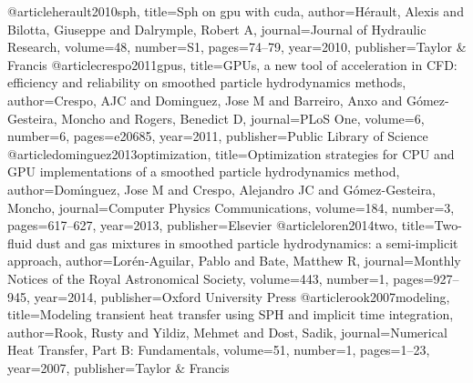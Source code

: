 @article{herault2010sph,
  title={Sph on gpu with cuda},
  author={H{\'e}rault, Alexis and Bilotta, Giuseppe and Dalrymple, Robert A},
  journal={Journal of Hydraulic Research},
  volume={48},
  number={S1},
  pages={74--79},
  year={2010},
  publisher={Taylor \& Francis}
}
@article{crespo2011gpus,
  title={GPUs, a new tool of acceleration in CFD: efficiency and reliability on smoothed particle hydrodynamics methods},
  author={Crespo, AJC and Dominguez, Jose M and Barreiro, Anxo and G{\'o}mez-Gesteira, Moncho and Rogers, Benedict D},
  journal={PLoS One},
  volume={6},
  number={6},
  pages={e20685},
  year={2011},
  publisher={Public Library of Science}
}
@article{dominguez2013optimization,
  title={Optimization strategies for CPU and GPU implementations of a smoothed particle hydrodynamics method},
  author={Dom{\'\i}nguez, Jose M and Crespo, Alejandro JC and G{\'o}mez-Gesteira, Moncho},
  journal={Computer Physics Communications},
  volume={184},
  number={3},
  pages={617--627},
  year={2013},
  publisher={Elsevier}
}
@article{loren2014two,
  title={Two-fluid dust and gas mixtures in smoothed particle hydrodynamics: a semi-implicit approach},
  author={Lor{\'e}n-Aguilar, Pablo and Bate, Matthew R},
  journal={Monthly Notices of the Royal Astronomical Society},
  volume={443},
  number={1},
  pages={927--945},
  year={2014},
  publisher={Oxford University Press}
}
@article{rook2007modeling,
  title={Modeling transient heat transfer using SPH and implicit time integration},
  author={Rook, Rusty and Yildiz, Mehmet and Dost, Sadik},
  journal={Numerical Heat Transfer, Part B: Fundamentals},
  volume={51},
  number={1},
  pages={1--23},
  year={2007},
  publisher={Taylor \& Francis}
}

